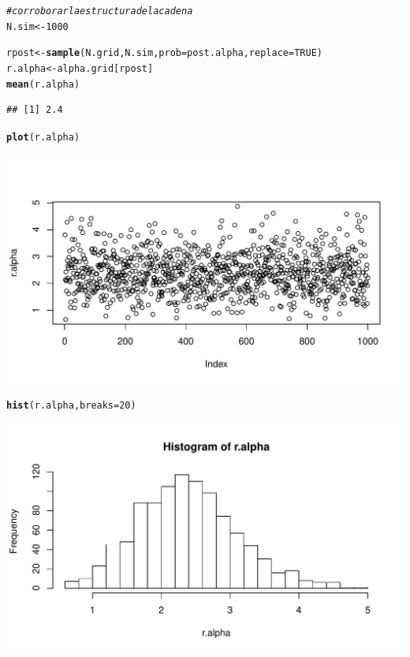 \documentclass[10pt,openright]{book}\usepackage[]{graphicx}\usepackage[]{color}
\makeatletter
\def\maxwidth{ %
  \ifdim\Gin@nat@width>\linewidth
    \linewidth
  \else
    \Gin@nat@width
  \fi
}
\newcommand{\hlnum}[1]{\textcolor[rgb]{0.686,0.059,0.569}{#1}}%
\newcommand{\hlcom}[1]{\textcolor[rgb]{0.678,0.584,0.686}{\textit{#1}}}%
\newcommand{\hlstd}[1]{\textcolor[rgb]{0.345,0.345,0.345}{#1}}%
\newcommand{\hlkwb}[1]{\textcolor[rgb]{0.69,0.353,0.396}{#1}}%
\newcommand{\hlkwc}[1]{\textcolor[rgb]{0.333,0.667,0.333}{#1}}%
\newcommand{\hlkwd}[1]{\textcolor[rgb]{0.737,0.353,0.396}{\textbf{#1}}}%
\newenvironment{kframe}{%
 \def\at@end@of@kframe{}%
 \ifinner\ifhmode%
  \def\at@end@of@kframe{\end{minipage}}%
  \begin{minipage}{\columnwidth}%
 \fi\fi%
 \def\FrameCommand##1{\hskip\@totalleftmargin \hskip-\fboxsep
 \colorbox{shadecolor}{##1}\hskip-\fboxsep
     \hskip-\linewidth \hskip-\@totalleftmargin \hskip\columnwidth}%
 \MakeFramed {\advance\hsize-\width
   \@totalleftmargin\z@ \linewidth\hsize
   \@setminipage}}%
 {\par\unskip\endMakeFramed%
 \at@end@of@kframe}
\newenvironment{knitrout}{}{} %
\makeatother
\begin{document}
\begin{knitrout}
\color{fgcolor}\begin{kframe}
\begin{alltt}
\hlcom{# corroborar la estructura de la cadena}
\hlstd{N.sim} \hlkwb{<-} \hlnum{1000}

\hlstd{rpost} \hlkwb{<-} \hlkwd{sample}\hlstd{(N.grid, N.sim,} \hlkwc{prob}\hlstd{=post.alpha,} \hlkwc{replace}\hlstd{=}\hlnum{TRUE}\hlstd{)}
\hlstd{r.alpha} \hlkwb{<-} \hlstd{alpha.grid[rpost]}
\hlkwd{mean}\hlstd{(r.alpha)}
\end{alltt}
\begin{verbatim}
## [1] 2.4
\end{verbatim}
\begin{alltt}
\hlkwd{plot}\hlstd{(r.alpha)}
\end{alltt}
\end{kframe}
\includegraphics[width=\maxwidth]{figure/unnamed-chunk-73-1} 
\begin{kframe}\begin{alltt}
\hlkwd{hist}\hlstd{(r.alpha,} \hlkwc{breaks}\hlstd{=}\hlnum{20}\hlstd{)}
\end{alltt}
\end{kframe}
\includegraphics[width=\maxwidth]{figure/unnamed-chunk-73-2} 

\end{knitrout}
\end{document}
